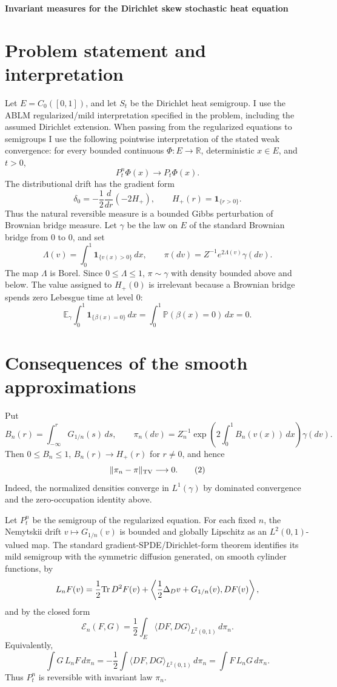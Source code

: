 \documentclass[12pt]{article}
\newcommand{\R}{\mathbb R}
\newcommand{\E}{\mathbb E}
\newcommand{\1}{\mathbf 1}
\newcommand{\cE}{\mathcal E}
\begin{document}
\begin{center}
{\bf Invariant measures for the Dirichlet skew stochastic heat equation}
\end{center}

\section*{Problem statement and interpretation}

Let \(E=C_0([0,1])\), and let \(S_t\) be the Dirichlet heat semigroup.
I use the ABLM regularized/mild interpretation specified in the problem,
including the assumed Dirichlet extension.  When passing from the
regularized equations to semigroups I use the following pointwise
interpretation of the stated weak convergence: for every bounded continuous
\(\Phi:E\to\R\), deterministic \(x\in E\), and \(t>0\),
\[
        P_t^n\Phi(x)\longrightarrow P_t\Phi(x).      \tag{A}
\]
The distributional drift has the gradient form
\[
        \delta_0=-\frac12\frac{d}{dr}(-2H_+),\qquad
        H_+(r)=\1_{\{r>0\}} .
\]
Thus the natural reversible measure is a bounded Gibbs perturbation of
Brownian bridge measure.  Let \(\gamma\) be the law on \(E\) of the
standard Brownian bridge from \(0\) to \(0\), and set
\[
   \Lambda(v)=\int_0^1\1_{\{v(x)>0\}}\,dx,\qquad
   \pi(dv)=Z^{-1}e^{2\Lambda(v)}\gamma(dv).       \tag{1}
\]
The map \(\Lambda\) is Borel.  Since \(0\le\Lambda\le1\), \(\pi\sim\gamma\)
with density bounded above and below.  The value assigned to \(H_+(0)\)
is irrelevant because a Brownian bridge spends zero Lebesgue time at
level \(0\):
\[
   \E_\gamma\int_0^1\1_{\{\beta(x)=0\}}\,dx
    =\int_0^1\mathbb P(\beta(x)=0)\,dx=0 .
\]

\section*{Consequences of the smooth approximations}

Put
\[
   B_n(r)=\int_{-\infty}^rG_{1/n}(s)\,ds,\qquad
   \pi_n(dv)=Z_n^{-1}\exp\!\left(2\int_0^1B_n(v(x))\,dx\right)\gamma(dv).
\]
Then \(0\le B_n\le1\), \(B_n(r)\to H_+(r)\) for \(r\ne0\), and hence
\[
       \|\pi_n-\pi\|_{\rm TV}\longrightarrow0 .          \tag{2}
\]
Indeed, the normalized densities converge in \(L^1(\gamma)\) by dominated
convergence and the zero-occupation identity above.

Let \(P_t^n\) be the semigroup of the regularized equation.  For each
fixed \(n\), the Nemytskii drift \(v\mapsto G_{1/n}(v)\) is bounded and
globally Lipschitz as an \(L^2(0,1)\)-valued map.  The standard
gradient-SPDE/Dirichlet-form theorem identifies its mild semigroup with
the symmetric diffusion generated, on smooth cylinder functions, by
\[
 L_nF(v)=\frac12{\rm Tr}\,D^2F(v)
       +\left\langle \frac12\Delta_Dv+G_{1/n}(v),DF(v)\right\rangle ,
\]
and by the closed form
\[
   \cE_n(F,G)=\frac12\int_E\langle DF,DG\rangle_{L^2(0,1)}\,d\pi_n .
\]
Equivalently,
\[
   \int G\,L_nF\,d\pi_n
   =-\frac12\int\langle DF,DG\rangle_{L^2(0,1)}\,d\pi_n
   =\int F\,L_nG\,d\pi_n.                         \tag{3}
\]
Thus \(P_t^n\) is reversible with invariant law \(\pi_n\).
\end{document}
